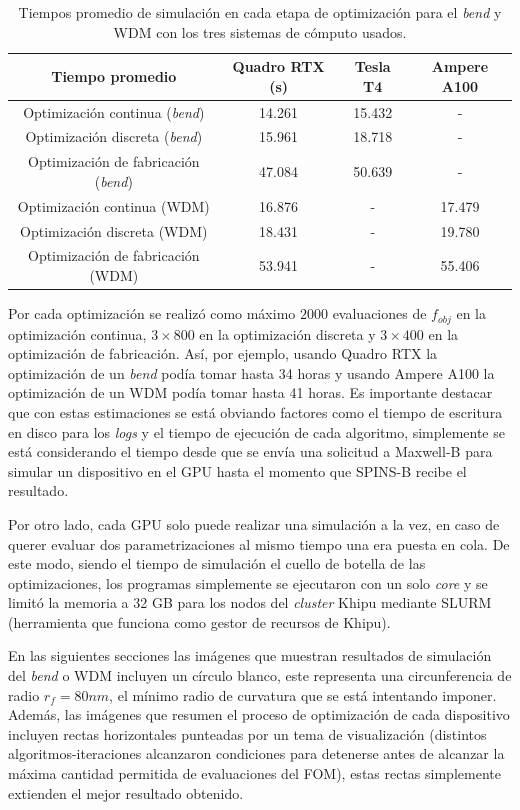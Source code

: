 \begin{table}[ht]
    \centering
    \begin{tabular}{|c|c|c|c|}
    \hline 
      Tiempo promedio &  Quadro RTX (s) & Tesla T4 & Ampere A100 \\
    \hline 
      Optimización continua (\emph{bend})            & 14.261 & 15.432 & - \\
      Optimización discreta (\emph{bend})            & 15.961 & 18.718 & - \\
      Optimización de fabricación (\emph{bend})      & 47.084 & 50.639 & - \\
      Optimización continua (WDM)                    & 16.876 & - & 17.479 \\
      Optimización discreta (WDM)                    & 18.431 & - & 19.780 \\
      Optimización de fabricación (WDM)              & 53.941 & - & 55.406 \\
    \hline 
    \end{tabular}
    \caption{Tiempos promedio de simulación en cada etapa de optimización para el \emph{bend} y WDM con los
    tres sistemas de cómputo usados.}
    \label{tab:times}
\end{table}

Por cada optimización se realizó como máximo $2000$ evaluaciones de $f_{obj}$ en la optimización continua,
$3 \times 800$ en la optimización discreta y $3 \times 400$ en la optimización de fabricación.
Así, por ejemplo, usando Quadro RTX la optimización de un \emph{bend} podía tomar hasta 34 horas
y usando Ampere A100 la optimización de un WDM podía tomar hasta 41 horas.
Es importante destacar que con estas estimaciones se está obviando factores como
el tiempo de escritura en disco para los \emph{logs} y 
el tiempo de ejecución de cada algoritmo, simplemente se está considerando
el tiempo desde que se envía una solicitud a Maxwell-B para simular un dispositivo en el GPU
hasta el momento que SPINS-B recibe el resultado.

Por otro lado, cada GPU solo puede realizar una simulación a la vez, en caso de querer 
evaluar dos parametrizaciones al mismo tiempo una era puesta en cola. De este modo,
siendo el tiempo de simulación el cuello de botella de las optimizaciones, los programas simplemente
se ejecutaron con un solo \emph{core} y se limitó la memoria a 32 GB para los nodos del \emph{cluster}
Khipu mediante SLURM (herramienta que funciona como gestor de recursos de Khipu).


En las siguientes secciones las imágenes que muestran resultados de simulación del \emph{bend} o WDM
incluyen un círculo blanco, este representa una circunferencia de radio $r_f = 80 nm$,
el mínimo radio de curvatura que se está intentando imponer.
Además, las imágenes que resumen el proceso de optimización de cada dispositivo incluyen
rectas horizontales punteadas por un tema de visualización (distintos algoritmos-iteraciones
alcanzaron condiciones para detenerse antes de alcanzar la máxima cantidad permitida de
evaluaciones del FOM), estas rectas simplemente extienden el mejor resultado obtenido.

